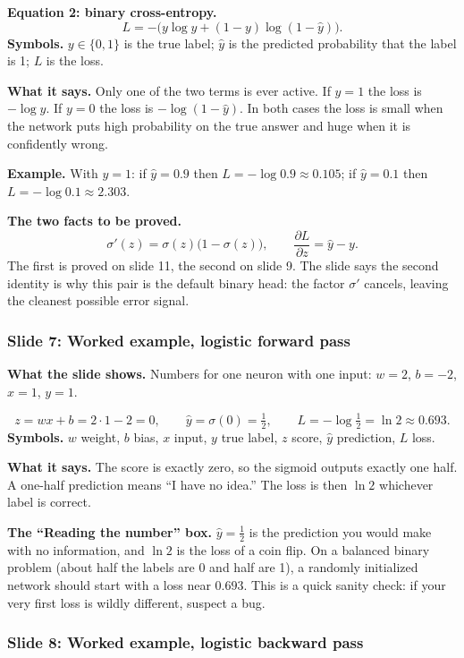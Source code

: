 \textbf{Equation 2: binary cross-entropy.}
\[
L = -\Big(y\log\hat{y} + (1-y)\log(1-\hat{y})\Big).
\]
\textbf{Symbols.} $y \in \{0,1\}$ is the true label; $\hat{y}$ is the predicted probability that the label is 1; $L$ is the loss.

\textbf{What it says.} Only one of the two terms is ever active. If $y=1$ the loss is $-\log\hat{y}$. If $y=0$ the loss is $-\log(1-\hat{y})$. In both cases the loss is small when the network puts high probability on the true answer and huge when it is confidently wrong.

\textbf{Example.} With $y=1$: if $\hat{y} = 0.9$ then $L = -\log 0.9 \approx 0.105$; if $\hat{y}=0.1$ then $L = -\log 0.1 \approx 2.303$.

\textbf{The two facts to be proved.}
\[
\sigma'(z) = \sigma(z)\big(1-\sigma(z)\big), \qquad \frac{\partial L}{\partial z} = \hat{y}-y.
\]
The first is proved on slide 11, the second on slide 9. The slide says the second identity is why this pair is the default binary head: the factor $\sigma'$ cancels, leaving the cleanest possible error signal.

\subsubsection{Slide 7: Worked example, logistic forward pass}

\textbf{What the slide shows.} Numbers for one neuron with one input: $w=2$, $b=-2$, $x=1$, $y=1$.

\[
z = wx+b = 2\cdot1-2 = 0, \qquad \hat{y} = \sigma(0) = \tfrac12, \qquad L = -\log\tfrac12 = \ln 2 \approx 0.693.
\]
\textbf{Symbols.} $w$ weight, $b$ bias, $x$ input, $y$ true label, $z$ score, $\hat{y}$ prediction, $L$ loss.

\textbf{What it says.} The score is exactly zero, so the sigmoid outputs exactly one half. A one-half prediction means ``I have no idea.'' The loss is then $\ln 2$ whichever label is correct.

\textbf{The ``Reading the number'' box.} $\hat{y}=\tfrac12$ is the prediction you would make with no information, and $\ln 2$ is the loss of a coin flip. On a balanced binary problem (about half the labels are 0 and half are 1), a randomly initialized network should start with a loss near $0.693$. This is a quick sanity check: if your very first loss is wildly different, suspect a bug.

\subsubsection{Slide 8: Worked example, logistic backward pass}

